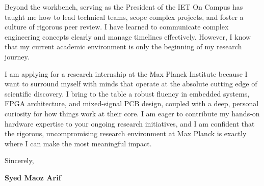 \documentclass[11pt,a4paper]{article}
\begin{document}
\vspace{10pt}

\noindent Beyond the workbench, serving as the President of the IET On Campus has taught me how to lead technical teams, scope complex projects, and foster a culture of rigorous peer review. I have learned to communicate complex engineering concepts clearly and manage timelines effectively. However, I know that my current academic environment is only the beginning of my research journey.

\vspace{10pt}

\noindent I am applying for a research internship at the Max Planck Institute because I want to surround myself with minds that operate at the absolute cutting edge of scientific discovery. I bring to the table a robust fluency in embedded systems, FPGA architecture, and mixed-signal PCB design, coupled with a deep, personal curiosity for how things work at their core. I am eager to contribute my hands-on hardware expertise to your ongoing research initiatives, and I am confident that the rigorous, uncompromising research environment at Max Planck is exactly where I can make the most meaningful impact.

\vspace{20pt}
\noindent Sincerely,

\vspace{15pt}
\noindent \textbf{Syed Maoz Arif}
\end{document}
